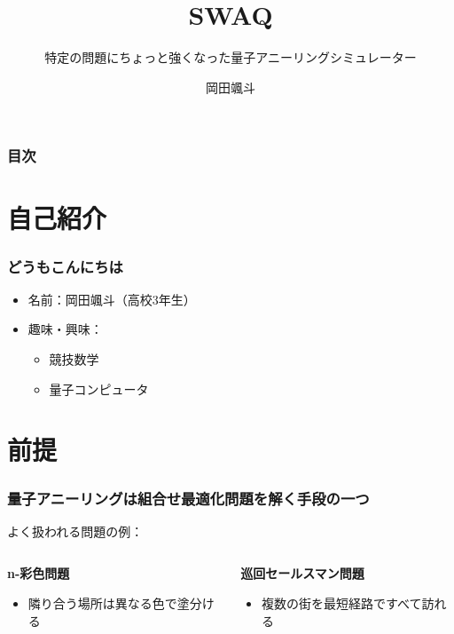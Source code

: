 \title[Swaq]{\color{black} \LARGE SWAQ}
\subtitle[ちょっと強いQAS]{特定の問題にちょっと強くなった量子アニーリングシミュレーター}
\author[岡田颯斗]{岡田颯斗}
\date{}
\begin{frame}{}
\titlepage
\end{frame}
\large

\begin{frame}
  \frametitle{目次}
  \tableofcontents
\end{frame}


\section{自己紹介}
\begin{frame}
  \frametitle{どうもこんにちは}
  \begin{itemize}
      \item 名前：岡田颯斗（高校3年生）
      \item 趣味・興味：
      \begin{itemize}
          \item 競技数学
          \item 量子コンピュータ
      \end{itemize}
  \end{itemize}
\end{frame}

\section{前提}
\begin{frame}
  \frametitle{量子アニーリングは組合せ最適化問題を解く手段の一つ\cite{Kadowaki_1998}\cite{大関真之2018量子アニーリングによる組合せ最適化}}
  よく扱われる問題の例\cite{lucas2014ising}：\\
  \vspace{10mm}
  \begin{columns}
    \begin{column}{0.45\textwidth}
      \textbf{n-彩色問題}
      \begin{itemize}
          \item 隣り合う場所は異なる色で塗分ける
      \end{itemize}
    \end{column}

    \begin{column}{0.45\textwidth}
      \textbf{巡回セールスマン問題}
      \begin{itemize}
          \item 複数の街を最短経路ですべて訪れる
      \end{itemize}
    \end{column}
  \end{columns}
  \vspace{5mm}
\end{frame}

